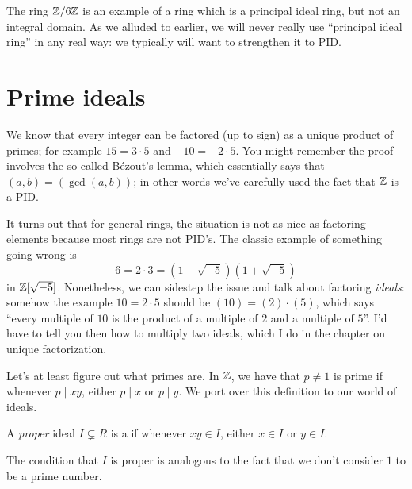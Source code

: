 The ring $\mathbb Z/6\mathbb Z$ is an example of a ring
which is a principal ideal ring, but not an integral domain.
As we alluded to earlier, we will never really use ``principal ideal ring''
in any real way: we typically will want to strengthen it to PID.

\section{Prime ideals}

We know that every integer can be factored (up to sign)
as a unique product of primes; for example $15 = 3 \cdot 5$
and $-10 = -2 \cdot 5$.
You might remember the proof involves the so-called B\'ezout's lemma,
which essentially says that $(a,b) = (\gcd(a,b))$;
in other words we've carefully used the fact that $\mathbb Z$ is a PID.

It turns out that for general rings, the situation is not as nice
as factoring elements because most rings are not PID's.
The classic example of something going wrong is
\[ 6 = 2 \cdot 3 = \left( 1-\sqrt{-5} \right)\left( 1+\sqrt{-5} \right) \]
in $\mathbb Z[\sqrt{-5}]$.
Nonetheless, we can sidestep the issue
and talk about factoring \emph{ideals}:
somehow the example $10 = 2 \cdot 5$ should be $(10) = (2) \cdot (5)$,
which says ``every multiple of $10$ is the product of a
multiple of $2$ and a multiple of $5$''.
I'd have to tell you then how to multiply two ideals, which I do
in the chapter on unique factorization.

Let's at least figure out what primes are.
In $\mathbb Z$, we have that $p \neq 1$ is prime if whenever $p \mid xy$,
either $p \mid x$ or $p \mid y$.
We port over this definition to our world of ideals.
\begin{definition}
	\label{def:prime_ideal}
	A \emph{proper} ideal $I \subsetneq R$ is a 
	if whenever $xy \in I$, either $x \in I$ or $y \in I$.
\end{definition}
The condition that $I$ is proper is analogous to the
fact that we don't consider $1$ to be a prime number.

